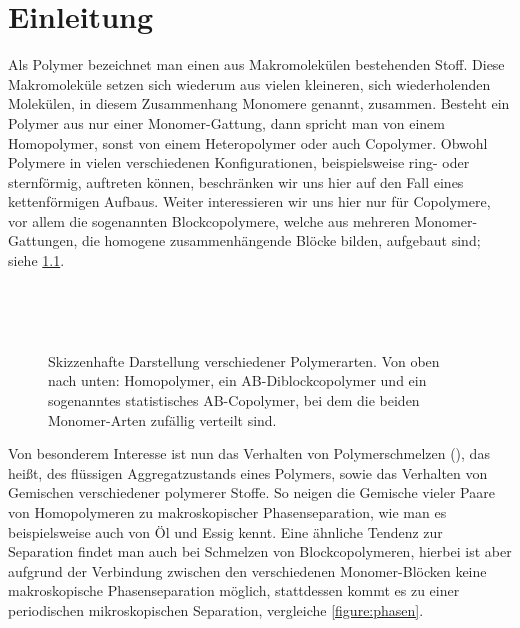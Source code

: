 
\chapter{Einleitung} %
\label{chapter:einleitung}

Als Polymer bezeichnet man einen aus Makromolekülen bestehenden Stoff.
Diese Makromoleküle setzen sich wiederum aus vielen kleineren, sich wiederholenden Molekülen, in diesem Zusammenhang Monomere genannt, zusammen.
Besteht ein Polymer aus nur einer Monomer-Gattung, dann spricht man von einem Homopolymer, sonst von einem Heteropolymer oder auch Copolymer.
Obwohl Polymere in vielen verschiedenen Konfigurationen, beispielsweise ring- oder sternförmig, auftreten können, beschränken wir uns hier auf den Fall eines kettenförmigen Aufbaus.
Weiter interessieren wir uns hier nur für Copolymere, vor allem die sogenannten Blockcopolymere, welche aus mehreren Monomer-Gattungen, die homogene zusammenhängende Blöcke bilden, aufgebaut sind; siehe \cref{figure:polymerketten}.

\begin{figure}[tb]
    \centering
    \begin{subfigure}[b]{\textwidth}
        \centering
        
    \end{subfigure}
    \\[0.33em]
    \begin{subfigure}[b]{\textwidth}
        \centering
        
    \end{subfigure}
    \\[0.33em]
    \begin{subfigure}[b]{\textwidth}
        \centering
        
    \end{subfigure}
    \caption[Skizzenhafte Darstellung verschiedener Polymerarten]{%
        Skizzenhafte Darstellung verschiedener Polymerarten.
        Von oben nach unten: Homopolymer, ein AB-Diblockcopolymer und ein sogenanntes statistisches AB-Copolymer, bei dem die beiden Monomer-Arten zufällig verteilt sind.
    }
    \label{figure:polymerketten}
\end{figure}

Von besonderem Interesse ist nun das Verhalten von Polymerschmelzen (), das heißt, des flüssigen Aggregatzustands eines Polymers, sowie das Verhalten von Gemischen verschiedener polymerer Stoffe.
So neigen die Gemische vieler Paare von Homopolymeren zu makroskopischer Phasenseparation, wie man es beispielsweise auch von Öl und Essig kennt.
Eine ähnliche Tendenz zur Separation findet man auch bei Schmelzen von Blockcopolymeren, hierbei ist aber aufgrund der Verbindung zwischen den verschiedenen Monomer-Blöcken keine makroskopische Phasenseparation möglich, stattdessen kommt es zu einer periodischen mikroskopischen Separation, vergleiche \cref{figure:phasen}.

